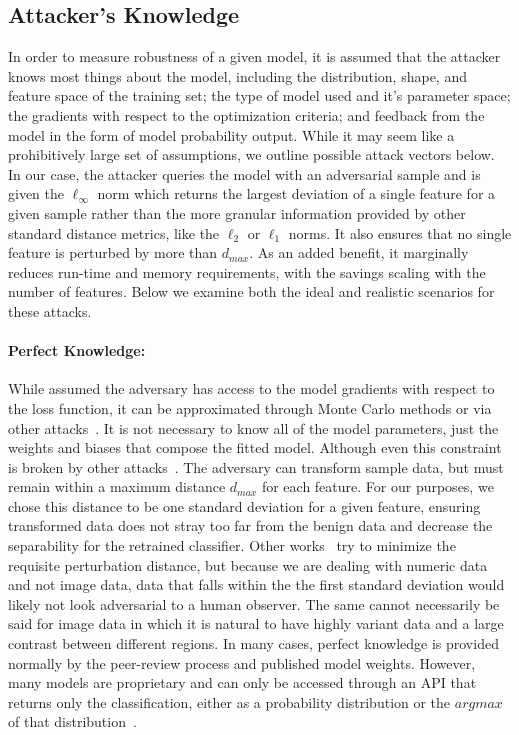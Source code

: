 \documentclass[fonts]{icst}
\begin{document}
\subsection{Attacker's Knowledge}

In order to measure robustness of a given model, it is assumed that the attacker knows most things about the model, including the distribution, shape, and feature space of the training set; the type of model used and it's parameter space; the gradients with respect to the optimization criteria; and feedback from the model in the form of model probability output.
While it may seem like a prohibitively large set of assumptions, we outline possible attack vectors below.
In our case, the attacker queries the model with an adversarial sample and is given the $\ell_{\infty}$ norm which returns the largest deviation of a single feature for a given sample rather than the more granular information provided by other standard distance metrics, like the $\ell_2$ or $\ell_1$ norms.
It also ensures that no single feature is perturbed by more than $d_{max}$.
As an added benefit, it marginally reduces run-time and memory requirements, with the savings scaling with the number of features.
Below we examine both the ideal and realistic scenarios for these attacks.

\paragraph{Perfect Knowledge: }
While assumed the adversary has access to the model gradients with respect to the loss function, it can be approximated through Monte Carlo methods or via other attacks~\cite{wang2019security,chakraborty2018adversarial}.
It is not necessary to know all of the model parameters, just the weights and biases that compose the fitted model.
Although even this constraint is broken by other attacks~\cite{wang2019security,chakraborty2018adversarial}.
The adversary can transform sample data, but must remain within a maximum distance $d_{max}$ for each feature.
For our purposes, we chose this distance to be one standard deviation for a given feature, ensuring transformed data does not stray too far from the benign data and decrease the separability for the retrained classifier.
Other works~\cite{biggio2012poisoning,stutz2019confidence,li2016general} try to minimize the requisite perturbation distance, but because we are dealing with numeric data and not image data, data that falls within the the first standard deviation would likely not look adversarial to a human observer.
The same cannot necessarily be said for image data in which it is natural to have highly variant data and a large contrast between different regions.
In many cases, perfect knowledge is provided normally by the peer-review process and published model weights.
However, many models are proprietary and can only be accessed through an API that returns only the classification, either as a probability distribution or the $argmax$ of that distribution~\cite{tramer2016stealing}.
\end{document}
